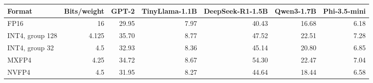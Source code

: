 \begin{tabular}{lrrrrrr}
\toprule
Format & Bits/weight & GPT-2 & TinyLlama-1.1B & DeepSeek-R1-1.5B & Qwen3-1.7B & Phi-3.5-mini \\
\midrule
FP16 & 16 & 29.95 & 7.97 & 40.43 & 16.68 & 6.18 \\
INT4, group 128 & 4.125 & 35.70 & 8.77 & 47.52 & 22.51 & 7.28 \\
INT4, group 32 & 4.5 & 32.93 & 8.36 & 45.14 & 20.80 & 6.85 \\
MXFP4 & 4.25 & 34.72 & 8.67 & 54.30 & 22.47 & 7.04 \\
NVFP4 & 4.5 & 31.95 & 8.27 & 44.64 & 18.44 & 6.58 \\
\bottomrule
\end{tabular}

